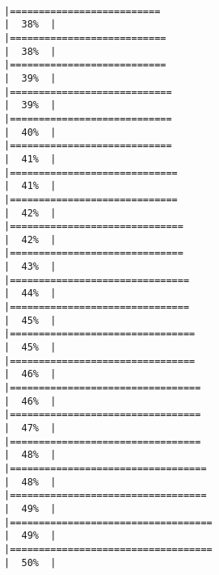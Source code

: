 \documentclass[12pt,twoside]{reedthesis}
\begin{document}
\begin{verbatim}
                                                                          |==========================                                            |  38%  |                                                                              |===========================                                           |  38%  |                                                                              |===========================                                           |  39%  |                                                                              |============================                                          |  39%  |                                                                              |============================                                          |  40%  |                                                                              |============================                                          |  41%  |                                                                              |=============================                                         |  41%  |                                                                              |=============================                                         |  42%  |                                                                              |==============================                                        |  42%  |                                                                              |==============================                                        |  43%  |                                                                              |===============================                                       |  44%  |                                                                              |===============================                                       |  45%  |                                                                              |================================                                      |  45%  |                                                                              |================================                                      |  46%  |                                                                              |=================================                                     |  46%  |                                                                              |=================================                                     |  47%  |                                                                              |=================================                                     |  48%  |                                                                              |==================================                                    |  48%  |                                                                              |==================================                                    |  49%  |                                                                              |===================================                                   |  49%  |                                                                              |===================================                                   |  50%  |     
\end{verbatim}
\end{document}
